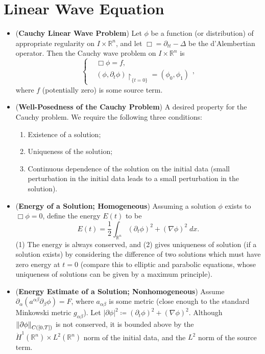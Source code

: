 \documentclass{article}
\begin{document}
\section{Linear Wave Equation} 
\begin{itemize}
	\item (\textbf{Cauchy Linear Wave Problem}) Let $\phi$ be a function (or distribution) of appropriate regularity on $I \times \mathbb{R}^{n}$, and let $\Box = \partial_{tt} - \Delta$ be the d'Alembertian operator. Then the Cauchy wave problem on $I \times \mathbb{R}^{n}$ is 
	\begin{equation*}
		\left\{
		\begin{alignedat}{1}
			&\Box\phi = f,  \\
			&(\phi, \partial_{t}\phi)\upharpoonright_{\{t = 0\}} = (\phi_{0}, \phi_{1})
		\end{alignedat}
		\right., 
	\end{equation*}
	where $f$ (potentially zero) is some source term. 
	\item (\textbf{Well-Posedness of the Cauchy Problem}) A desired property for the Cauchy problem. We require the following three conditions: \vspace{-0.2cm}
	\begin{enumerate}
		\item Existence of a solution; 
		\item Uniqueness of the solution; 
		\item Continuous dependence of the solution on the initial data (small perturbation in the initial data leads to a small perturbation in the solution). 
	\end{enumerate}
	\item (\textbf{Energy of a Solution; Homogeneous}) Assuming a solution $\phi$ exists to $\Box\phi = 0$, define the energy $E(t)$ to be 
	\begin{equation*}
		E(t) = \frac{1}{2}\int_{\mathbb{R}^{n}}(\partial_{t}\phi)^{2} + (\nabla \phi)^{2}\;dx. 
	\end{equation*}
	(1) The energy is always conserved, and (2) gives uniqueness of solution (if a solution exists) by considering the difference of two solutions which must have zero energy at $t = 0$ (compare this to elliptic and parabolic equations, whose uniqueness of solutions can be given by a maximum principle). 
	\item (\textbf{Energy Estimate of a Solution; Nonhomogeneous}) Assume $\partial_{\alpha}(a^{\alpha\beta}\partial_{\beta}\phi) = F$, where $a_{\alpha\beta}$ is some metric (close enough to the standard Minkowski metric $g_{\alpha\beta}$). Let $|\partial \phi|^{2} \coloneqq (\partial_{t}\phi)^{2} + (\nabla \phi)^{2}$. Although $\left\Vert \partial \phi \right\Vert_{C([0,T])}$ is not conserved, it is bounded above by the $\dot{H}^{1}(\mathbb{R}^{n}) \times L^{2}(\mathbb{R}^{n})$ norm of the initial data, and the $L^{2}$ norm of the source term.
	

\end{itemize}
\end{document}
